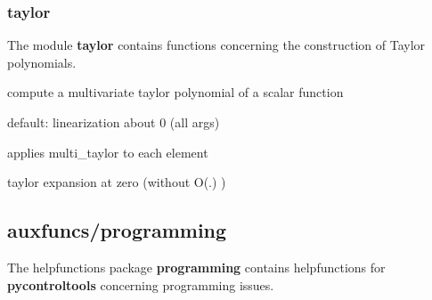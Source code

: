 \documentclass[letterpaper,10pt,english]{sphinxmanual}
\begin{document}
\subsubsection{\textbf{taylor}}
\label{pycontroltools:taylor}
The module \textbf{taylor} contains functions concerning the construction
of Taylor polynomials.
\label{pycontroltools:module-auxfuncs.math.taylor}\label{pycontroltools:module-taylor}

\begin{fulllineitems}
\label{pycontroltools:auxfuncs.math.taylor.multi_taylor}
compute a multivariate taylor polynomial of a scalar function

default: linearization about 0 (all args)

\end{fulllineitems}


\begin{fulllineitems}
\label{pycontroltools:auxfuncs.math.taylor.multi_taylor_matrix}
applies multi\_taylor to each element

\end{fulllineitems}


\begin{fulllineitems}
\label{pycontroltools:auxfuncs.math.taylor.series}
taylor expansion at zero (without O(.) )

\end{fulllineitems}



\subsection{\textbf{auxfuncs/programming}}
\label{pycontroltools:auxfuncs-programming}
The helpfunctions package \textbf{programming} contains helpfunctions for
\textbf{pycontroltools} concerning programming issues.
\end{document}

